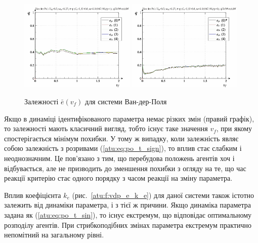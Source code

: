 \begin{figure}[ht!]
\begin{center}
  \includegraphics[width=0.49\textwidth]{p/cha/vdp/vdp_id-p_v_f_sign.png}
  \hfill
  \includegraphics[width=0.49\textwidth]{p/cha/vdp/vdp_id-p_v_f_sin.png}
\end{center}
  \caption{Залежності $\bar{e}(v_f)$ для системи Ван-дер-Поля}
\label{atu:f:vdp_e_v_f}
\end{figure}

Якщо в динаміці ідентифікованого параметра немає різких змін
(правий графік), то залежності мають класичний вигляд, тобто існує таке
значення $ v_f $, при якому спостерігається мінімум похибки. У тому
ж випадку, коли залежність являє собою залежність з
розривами (\ref{atu:eq:po_t_sign}), то вплив стає слабким
і неоднозначним. Це пов'язано з тим, що перебудова положень
агентів хоч і відбувається, але не призводить до зменшення
похибки з огляду на те, що час реакції критерію стає одного
порядку з часом реакції на зміну параметра.


Вплив коефіцієнта
$ k_e $ (рис.~\ref{atu:f:vdp_e_k_e}) для даної системи також істотно залежить
від динаміки параметра, і з тієї ж причини. Якщо динаміка
параметра задана як (\ref{atu:eq:po_t_sin}), то існує екстремум, що
відповідає оптимальному розподілу агентів. При стрибкоподібних
змінах параметра екстремум практично непомітний на загальному рівні.

